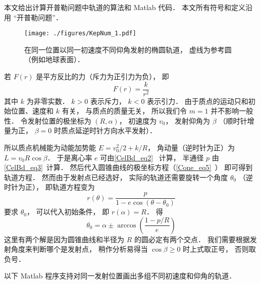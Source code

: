 
\begin{issues}
\end{issues}


本文给出计算开普勒问题中轨道的算法和 Matlab 代码． 本文所有符号和定义沿用 “开普勒问题”．
\begin{figure}[ht]
\centering
\texttt{[image: ./figures/KepNum\_1.pdf]}
\caption{在同一位置以同一初速度不同仰角发射的椭圆轨道， 虚线为参考圆（例如地球表面）．} \label{KepNum_fig1}
\end{figure}

若 $F(r)$ 是平方反比的力（斥力为正引力为负）， 即
\begin{equation}
F(r) = \frac{k}{r^2}
\end{equation}
其中 $k$ 为非零实数． $k>0$ 表示斥力， $k<0$ 表示引力． 由于质点的运动只和初始位置、速度和 $k$ 有关， 与质点的质量无关， 所以我们令 $m=1$ 并不影响一般性． 令发射位置的极坐标为 $(R,\alpha)$， 初速度为 $v_0$， 发射仰角为 $\beta$ （顺时针增量为正， $\beta=0$ 时质点延逆时针方向水平发射）．

所以质点机械能为动能加势能 $E = v_0^2/2 + k/R$， 角动量（逆时针为正）为 $L = v_0 R\cos\beta$． 于是离心率 $e$ 可由\autoref{CelBd_eq2}~ 计算， 半通径 $p$ 由\autoref{CelBd_eq3}~计算． 然后代入圆锥曲线的极坐标方程（\autoref{Cone_eq5}~） 即可得到轨道方程． 然而由于发射点已经选好， 实际的轨道还需要旋转一个角度 $\theta_0$ （逆时针为正）， 即轨道方程变为
\begin{equation}
r(\theta)  = \frac{p}{1 - e\cos (\theta-\theta_0)}
\end{equation}
要求 $\theta_0$， 可以代入初始条件， 即 $r(\alpha) = R$． 得
\begin{equation}
\theta_0 = \alpha \pm \arccos(\frac{1-p/R}{e})
\end{equation}
这里有两个解是因为圆锥曲线和半径为 $R$ 的圆必定有两个交点． 我们需要根据发射角度来判断哪个是发射点， 稍作分析易得当 $\cos\beta \geqslant 0$ 时上式取正号， 否则取负号．

以下 Matlab 程序支持对同一发射位置画出多组不同初速度和仰角的轨道．

